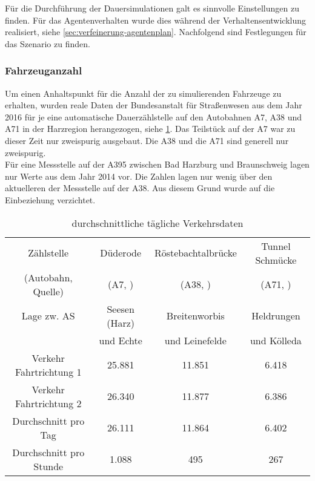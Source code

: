 Für die Durchführung der Dauersimulationen galt es sinnvolle Einstellungen zu finden. 
Für das Agentenverhalten wurde dies während der Verhaltensentwicklung realisiert, siehe \cref{sec:verfeinerung-agentenplan}. 
Nachfolgend sind Festlegungen für das Szenario zu finden.



\subsubsection{Fahrzeuganzahl}
\label{sec:fahrzeuganzahl}

Um einen Anhaltspunkt für die Anzahl der zu simulierenden Fahrzeuge zu erhalten, wurden reale Daten der Bundesanstalt für Straßenwesen aus dem Jahr 2016 für je eine automatische Dauerzählstelle auf den Autobahnen A7, A38 und A71 in der Harzregion herangezogen, siehe \cref{tab:reale-verkehrsdaten}. 
Das Teilstück auf der A7 war zu dieser Zeit nur zweispurig ausgebaut. 
Die A38 und die A71 sind generell nur zweispurig.
\\
Für eine Messstelle auf der A395 zwischen Bad Harzburg und Braunschweig lagen nur Werte aus dem Jahr 2014 vor.
Die Zahlen lagen nur wenig über den aktuelleren der Messstelle auf der A38.
Aus diesem Grund wurde auf die Einbeziehung verzichtet.


\begin{table}[hptb]
\begin{center}
\setlength{\tabcolsep}{0.5em} %
{\renewcommand{\arraystretch}{1.2}%
\begin{tabular}{| c  c  c  c |}
\hline 
Zählstelle & Düderode & Röstebachtalbrücke & Tunnel Schmücke \\
(Autobahn, Quelle) &  (A7, \cite{zaehlstelle-a7}) & (A38, \cite{zaehlstelle-a38}) &  (A71, \cite{zaehlstelle-a71}) \\
\hline 
Lage zw. AS & Seesen (Harz) & Breitenworbis & Heldrungen \\
 & und Echte & und Leinefelde & und Kölleda \\
\hline 
Verkehr Fahrtrichtung 1 & 25.881 & 11.851 & 6.418 \\ 
\hline 
Verkehr Fahrtrichtung 2 & 26.340 & 11.877 & 6.386 \\ 
\hline 
Durchschnitt pro Tag & 26.111 & 11.864 & 6.402 \\ 
\hline 
Durchschnitt pro Stunde & 1.088 & 495 & 267 \\ 
\hline
\end{tabular}
}
\caption{durchschnittliche tägliche Verkehrsdaten}
\label{tab:reale-verkehrsdaten}
\end{center}
\end{table}

